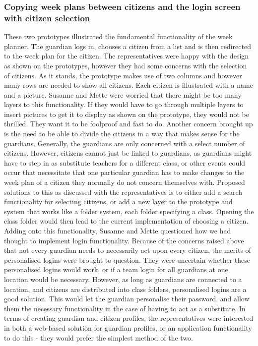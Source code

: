 \subsubsection{Copying week plans between citizens and the login screen with citizen selection}
These two prototypes illustrated the fundamental functionality of the week planner. 
The guardian logs in, chooses a citizen from a list and is then redirected to the week plan for the citizen.
The representatives were happy with the design as shown on the prototypes, however they had some concerns with the selection of citizens.
As it stands, the prototype makes use of two columns and however many rows are needed to show all citizens.
Each citizen is illustrated with a name and a picture.
Susanne and Mette were worried that there might be too many layers to this functionality.
If they would have to go through multiple layers to insert pictures to get it to display as shown on the prototype, they would not be thrilled.
They want it to be foolproof and fast to do.
Another concern brought up is the need to be able to divide the citizens in a way that makes sense for the guardians.
Generally, the guardians are only concerned with a select number of citizens.
However, citizens cannot just be linked to guardians, as guardians might have to step in as substitute teachers for a different class, or other events could occur that necessitate that one particular guardian has to make changes to the week plan of a citizen they normally do not concern themselves with.
Proposed solutions to this as discussed with the representatives is to either add a search functionality for selecting citizens, or add a new layer to the prototype and system that works like a folder system, each folder specifying a class.
Opening the class folder would then lead to the current implementation of choosing a citizen.
Adding onto this functionality, Susanne and Mette questioned how we had thought to implement login functionality.
Because of the concerns raised above that not every guardian needs to necessarily act upon every citizen, the merits of personalised logins were brought to question.
They were uncertain whether these personalised logins would work, or if a team login for all guardians at one location would be necessary. 
However, as long as guardians are connected to a location, and citizens are distributed into class folders, personalised logins are a good solution.
This would let the guardian personalise their password, and allow them the necessary functionality in the case of having to act as a substitute.
In terms of creating guardian and citizen profiles, the representatives were interested in both a web-based solution for guardian profiles, or an application functionality to do this - they would prefer the simplest method of the two.
